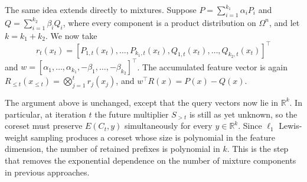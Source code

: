 \documentclass{article}
\begin{document}
The same idea extends directly to mixtures.  Suppose
$P=\sum_{i=1}^{k_1}\alpha_iP_i$ and
$Q=\sum_{i=1}^{k_2}\beta_iQ_i$, where every component is a product
distribution on $\Omega^n$, and let $k=k_1+k_2$. We now take
\[
    r_t(x_t)
    =
    [P_{1,t}(x_t),\ldots,P_{k_1,t}(x_t),
      Q_{1,t}(x_t),\ldots,Q_{k_2,t}(x_t)]^\top
\]
and
$w=[\alpha_1,\ldots,\alpha_{k_1},-\beta_1,\ldots,-\beta_{k_2}]^\top$.
The accumulated feature vector is again
$R_{\leq t}(x_{\leq t})
=\bigotimes_{j=1}^t r_j(x_j)$, and
$w^\top R(x)=P(x)-Q(x)$.

The argument above is unchanged, except that the query vectors now lie
in $\mathbb{R}^{k}$.
In particular, at iteration $t$ the future
multiplier $S_{>t}$ is still as yet unknown, so the coreset must preserve
$E(C_t,y)$ simultaneously for every $y\in\mathbb{R}^{k}$.
Since $\ell_1$ Lewis-weight sampling produces a coreset whose size is
polynomial in the feature dimension, the number of retained prefixes is
polynomial in $k$.  This is the step that removes the exponential
dependence on the number of mixture components in previous approaches.
\end{document}
